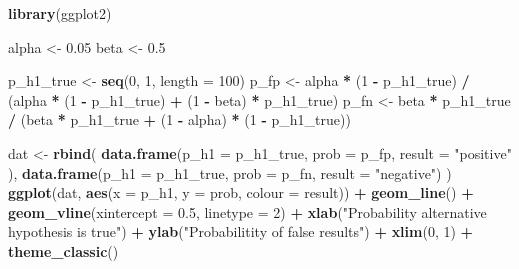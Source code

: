 \documentclass[
  12pt,
]{book}
\newenvironment{Shaded}{\begin{snugshade}}{\end{snugshade}}
\newcommand{\DataTypeTok}[1]{\textcolor[rgb]{0.13,0.29,0.53}{#1}}
\newcommand{\DecValTok}[1]{\textcolor[rgb]{0.00,0.00,0.81}{#1}}
\newcommand{\FloatTok}[1]{\textcolor[rgb]{0.00,0.00,0.81}{#1}}
\newcommand{\KeywordTok}[1]{\textcolor[rgb]{0.13,0.29,0.53}{\textbf{#1}}}
\newcommand{\NormalTok}[1]{#1}
\newcommand{\OperatorTok}[1]{\textcolor[rgb]{0.81,0.36,0.00}{\textbf{#1}}}
\newcommand{\StringTok}[1]{\textcolor[rgb]{0.31,0.60,0.02}{#1}}
\begin{document}
\begin{Shaded}
\begin{Highlighting}[]
\KeywordTok{library}\NormalTok{(ggplot2)}


\NormalTok{alpha \textless{}{-}}\StringTok{ }\FloatTok{0.05}
\NormalTok{beta \textless{}{-}}\StringTok{ }\FloatTok{0.5} 

\NormalTok{p\_h1\_true \textless{}{-}}\StringTok{ }\KeywordTok{seq}\NormalTok{(}\DecValTok{0}\NormalTok{, }\DecValTok{1}\NormalTok{, }\DataTypeTok{length =} \DecValTok{100}\NormalTok{)}
\NormalTok{p\_fp \textless{}{-}}\StringTok{ }\NormalTok{alpha }\OperatorTok{*}\StringTok{ }\NormalTok{(}\DecValTok{1} \OperatorTok{{-}}\StringTok{ }\NormalTok{p\_h1\_true) }\OperatorTok{/}
\StringTok{  }\NormalTok{(alpha }\OperatorTok{*}\StringTok{ }\NormalTok{(}\DecValTok{1} \OperatorTok{{-}}\StringTok{ }\NormalTok{p\_h1\_true) }\OperatorTok{+}\StringTok{ }\NormalTok{(}\DecValTok{1} \OperatorTok{{-}}\StringTok{ }\NormalTok{beta) }\OperatorTok{*}\StringTok{ }\NormalTok{p\_h1\_true)}
\NormalTok{p\_fn \textless{}{-}}\StringTok{ }\NormalTok{beta }\OperatorTok{*}\StringTok{ }\NormalTok{p\_h1\_true }\OperatorTok{/}
\StringTok{  }\NormalTok{(beta }\OperatorTok{*}\StringTok{ }\NormalTok{p\_h1\_true }\OperatorTok{+}\StringTok{ }\NormalTok{(}\DecValTok{1} \OperatorTok{{-}}\StringTok{ }\NormalTok{alpha) }\OperatorTok{*}\StringTok{ }\NormalTok{(}\DecValTok{1} \OperatorTok{{-}}\StringTok{ }\NormalTok{p\_h1\_true))}

\NormalTok{dat \textless{}{-}}\StringTok{ }\KeywordTok{rbind}\NormalTok{(}
  \KeywordTok{data.frame}\NormalTok{(}\DataTypeTok{p\_h1 =}\NormalTok{ p\_h1\_true, }\DataTypeTok{prob =}\NormalTok{ p\_fp, }\DataTypeTok{result =} \StringTok{"positive"}\NormalTok{ ),}
  \KeywordTok{data.frame}\NormalTok{(}\DataTypeTok{p\_h1 =}\NormalTok{ p\_h1\_true, }\DataTypeTok{prob =}\NormalTok{ p\_fn, }\DataTypeTok{result =} \StringTok{"negative"}\NormalTok{)}
\NormalTok{)}
\KeywordTok{ggplot}\NormalTok{(dat, }\KeywordTok{aes}\NormalTok{(}\DataTypeTok{x =}\NormalTok{ p\_h1, }\DataTypeTok{y =}\NormalTok{ prob, }\DataTypeTok{colour =}\NormalTok{ result)) }\OperatorTok{+}
\StringTok{  }\KeywordTok{geom\_line}\NormalTok{() }\OperatorTok{+}
\StringTok{  }\KeywordTok{geom\_vline}\NormalTok{(}\DataTypeTok{xintercept =} \FloatTok{0.5}\NormalTok{, }\DataTypeTok{linetype =} \DecValTok{2}\NormalTok{) }\OperatorTok{+}
\StringTok{  }\KeywordTok{xlab}\NormalTok{(}\StringTok{"Probability alternative hypothesis is true"}\NormalTok{) }\OperatorTok{+}\StringTok{ }
\StringTok{  }\KeywordTok{ylab}\NormalTok{(}\StringTok{"Probabilitity of false results"}\NormalTok{) }\OperatorTok{+}
\StringTok{  }\KeywordTok{xlim}\NormalTok{(}\DecValTok{0}\NormalTok{, }\DecValTok{1}\NormalTok{) }\OperatorTok{+}
\StringTok{  }\KeywordTok{theme\_classic}\NormalTok{()}
\end{Highlighting}
\end{Shaded}
\end{document}
